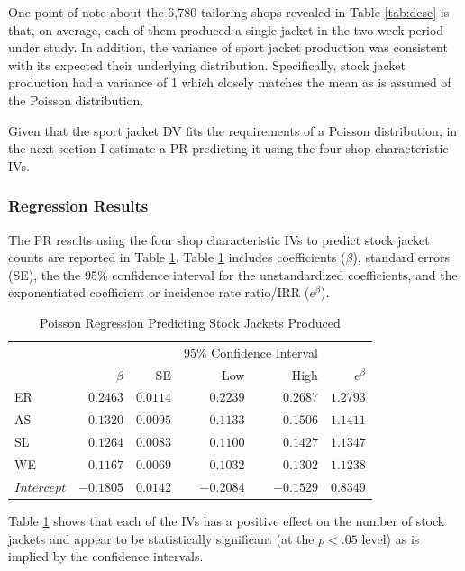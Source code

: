 \documentclass[ShortAfour,times,sageapa]{sagej}
\begin{document}
	One point of note about the 6,780 tailoring shops revealed in Table \ref{tab:desc} is that, on average, each of them produced a single jacket in the two-week period under study.
	In addition, the variance of sport jacket production was consistent with its expected their underlying distribution.
	Specifically, stock jacket production had a variance of 1 which closely matches the mean as is assumed of the Poisson distribution. 
	
	Given that the sport jacket DV fits the requirements of a Poisson distribution, in the next section I estimate a PR predicting it using the four shop characteristic IVs.

		\subsubsection{Regression Results}
		
	The PR results using the four shop characteristic IVs to predict stock jacket counts are reported in Table \ref{tab:poisreg}. 
	Table \ref{tab:poisreg} includes coefficients ($\beta$), standard errors (SE), the the 95\% confidence interval for the unstandardized coefficients, and the exponentiated coefficient or incidence rate ratio/IRR ($e^{\beta}$).
	
	\begin{table}[h!]
		\centering
		\caption{\centering Poisson Regression Predicting Stock Jackets Produced} 
		\begin{tabular}{l|rrrrr}
			\toprule
			\multicolumn{1}{l}{} &  &  & \multicolumn{2}{c}{95\% Confidence Interval} &   \\ 
			\cmidrule(lr){4-5}
			\multicolumn{1}{l}{} & $\beta$ & SE & Low & High & $e^{\beta}$ \\ 
			\midrule
			ER & $0.2463$ & $0.0114$ & $0.2239$ & $0.2687$ & $1.2793$ \\ 
			AS & $0.1320$ & $0.0095$ & $0.1133$ & $0.1506$ & $1.1411$ \\ 
			SL & $0.1264$ & $0.0083$ & $0.1100$ & $0.1427$ & $1.1347$ \\ 
			WE & $0.1167$ & $0.0069$ & $0.1032$ & $0.1302$ &  $1.1238$  \\ 
			$Intercept$ & $-0.1805$ & $0.0142$ & $-0.2084$ & $-0.1529$ & $0.8349$ \\
			\bottomrule
		\end{tabular}
		\label{tab:poisreg}
	\end{table}


	Table \ref{tab:poisreg} shows that each of the IVs has a positive effect on the number of stock jackets and appear to be statistically significant (at the $p < .05$ level) as is implied by the confidence intervals.
	
\end{document}
